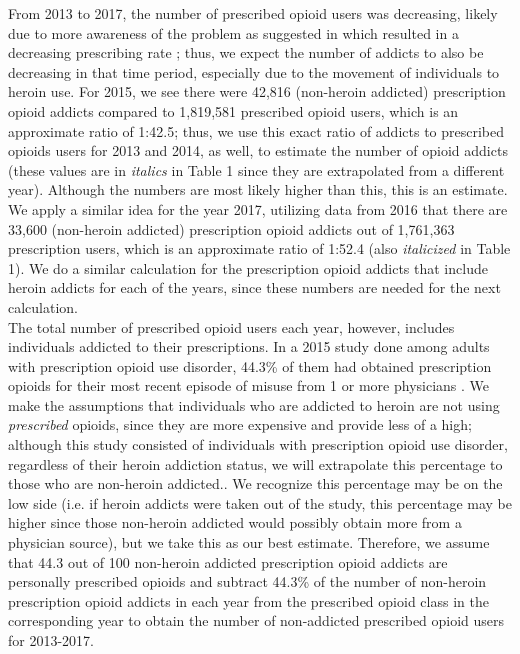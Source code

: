 \documentclass[12pt]{article}
\begin{document}
From 2013 to 2017, the number of prescribed opioid users was decreasing, likely due to more awareness of the problem as suggested in \cite{CDC7} which resulted in a decreasing prescribing rate \cite{PDO}; thus, we expect the number of addicts to also be decreasing in that time period, especially due to the movement of individuals to heroin use. For 2015, we see there were 42,816 (non-heroin addicted) prescription opioid addicts compared to 1,819,581 prescribed opioid users, which is an approximate ratio of 1:42.5; thus, we use this exact ratio of addicts to prescribed opioids users for 2013 and 2014, as well, to estimate the number of opioid addicts (these values are in \textit{italics} in Table 1 since they are extrapolated from a different year). Although the numbers are most likely higher than this, this is an estimate. We apply a similar idea for the year 2017, utilizing data from 2016 that there are 33,600 (non-heroin addicted) prescription opioid addicts out of 1,761,363 prescription users, which is an approximate ratio of 1:52.4 (also \textit{italicized} in Table 1). We do a similar calculation for the prescription opioid addicts that include heroin addicts for each of the years, since these numbers are needed for the next calculation. \\


The total number of prescribed opioid users each year, however, includes individuals addicted to their prescriptions. In a 2015 study done among adults with prescription opioid use disorder, 44.3\% of them had obtained prescription opioids for their most recent episode of misuse from 1 or more physicians \cite{Han}. We make the assumptions that individuals who are addicted to heroin are not using \textit{prescribed} opioids, since they are more expensive and provide less of a high; although this study consisted of individuals with prescription opioid use disorder, regardless of their heroin addiction status, we will extrapolate this percentage to those who are non-heroin addicted\cite{NIDA1}.. We recognize this percentage may be on the low side (i.e. if heroin addicts were taken out of the study, this percentage may be higher since those non-heroin addicted would possibly obtain more from a physician source), but we take this as our best estimate. Therefore, we assume that 44.3 out of 100 non-heroin addicted prescription opioid addicts are personally prescribed opioids and subtract 44.3\% of the number of non-heroin prescription opioid addicts in each year from the prescribed opioid class in the corresponding year to obtain the number of non-addicted prescribed opioid users for 2013-2017.  \\
\end{document}
